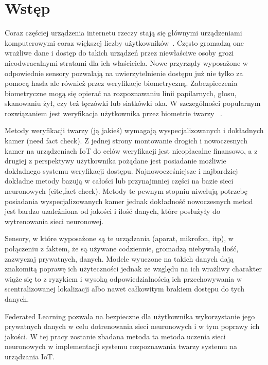 \newpage
\section{Wstęp}

Coraz częściej urządzenia internetu rzeczy stają się głównymi urządzeniami komputerowymi coraz
większej liczby użytkowników~\cite{SmartphoneOwenrship,SmartphoneOwenrshipv2}. Często gromadzą one wrażliwe dane i dostęp do takich
urządzeń przez niewłaściwe osoby grozi nieodwracalnymi stratami dla ich właściciela. Nowe
przyrządy wyposażone w odpowiednie sensory pozwalają na uwierzytelnienie dostępu już nie tylko za
pomocą hasła ale również przez weryfikacje biometryczną. Zabezpieczenia biometryczne mogą się
opierać na rozpoznawaniu linii papilarnych, głosu, skanowaniu żył, czy też tęczówki lub siatkówki
oka. W szczególności popularnym rozwiązaniem jest weryfikacja użytkownika przez biometrie twarzy ~\cite{FaceBiometic}.

Metody weryfikacji twarzy (ją jakieś) wymagają wyspecjalizowanych i dokładnych kamer (need fact
check). Z jednej strony montowanie drogich i nowoczesnych kamer na urządzeniach IoT do celów
weryfikacji jest nieopłacalne finansowo, a z drugiej z perspektywy użytkownika pożądane jest
posiadanie możliwie dokładnego systemu weryfikacji dostępu. Najnowocześniejsze i najbardziej
dokładne metody bazują w całości lub przynajmniej części na bazie sieci neuronowych (cite,fact
check). Metody te pewnym stopniu niwelują potrzebę posiadania wyspecjalizowanych kamer jednak
dokładność nowoczesnych metod jest bardzo uzależniona od jakości i ilość danych, które posłużyły
do wytrenowania sieci neuronowej.

Sensory, w które wyposażone są te urządzania (aparat, mikrofon, itp), w połączeniu z
faktem, że są używane codziennie, gromadzą niebywałą ilość, zazwyczaj prywatnych,
danych. Modele wyuczone na takich danych dają znakomitą poprawę ich użyteczności jednak ze względu
na ich wrażliwy charakter wiąże się to z ryzykiem i wysoką odpowiedzialnością ich
przechowywania w scentralizowanej lokalizacji albo nawet całkowitym brakiem dostępu do tych
danych.

Federated Learning pozwala na bezpieczne dla użytkownika wykorzystanie jego prywatnych danych
w celu dotrenowania sieci neuronowych i w tym poprawy ich jakości. W tej pracy zostanie
zbadana metoda ta metoda uczenia sieci neuronowych w implementacji systemu rozpoznawania twarzy
systemu na urządzania IoT.

\smallbreak

